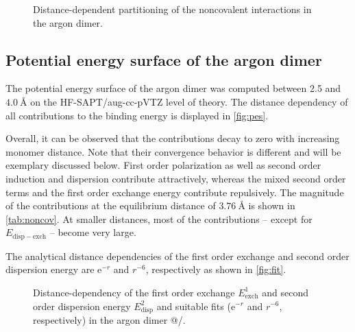 \documentclass[a4paper,12pt]{scrartcl}
\newcommand{\m}[1]{\mathrm{#1}}
\begin{document}
\begin{figure}
	\centering
	
	\vspace{-20pt}
	\caption{Distance-dependent partitioning of the noncovalent interactions in the argon dimer.}
	\label{fig:pes}
\end{figure}



\subsection{Potential energy surface of the argon dimer}
%
The potential energy surface of the argon dimer was computed between 2.5 and $ \SI{4.0}{\angstrom} $ on the HF-SAPT/aug-cc-pVTZ level of theory. The distance dependency of all contributions to the binding energy is displayed in \autoref{fig:pes}.

Overall, it can be observed that the contributions decay to zero with increasing monomer distance. Note that their convergence behavior is different and will be exemplary discussed below. First order polarization as well as second order induction and dispersion contribute attractively, whereas the mixed second order terms and the first order exchange energy contribute repulsively. The magnitude of the contributions at the equilibrium distance of $ \SI{3.76}{\angstrom} $ is shown in \autoref{tab:noncov}. At smaller distances, most of the contributions -- except for $E_\m{disp-exch} $ -- become very large.

The analytical distance dependencies of the first order exchange and second order dispersion energy are $ \m{e}^{-r} $ and $ r^{-6} $, respectively as shown in \autoref{fig:fit}.

\begin{figure}
	\centering
	
	\vspace{-20pt}
	\caption{Distance-dependency of the first order exchange $ E^1_\m{exch} $ and second order dispersion energy $ E^2_\m{disp} $ and suitable fits ($ \m{e}^{-r} $ and $ r^{-6} $, respectively) in the argon dimer @/.}
	\label{fig:fit}
\end{figure}
%
\end{document}
